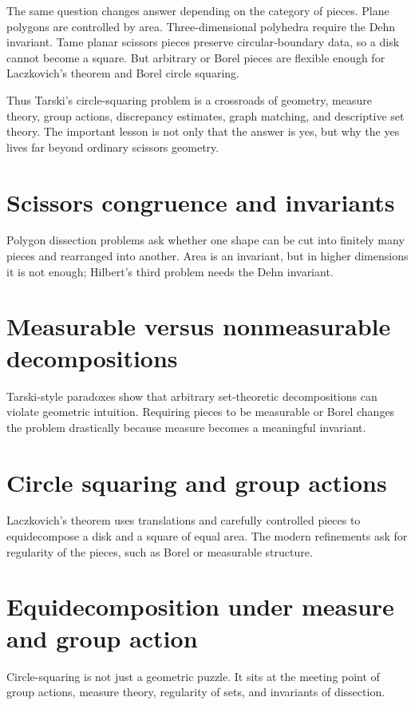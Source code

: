The same question changes answer depending on the category of pieces.  Plane polygons are controlled by area.  Three-dimensional polyhedra require the Dehn invariant.  Tame planar scissors pieces preserve circular-boundary data, so a disk cannot become a square.  But arbitrary or Borel pieces are flexible enough for Laczkovich's theorem and Borel circle squaring.

Thus Tarski's circle-squaring problem is a crossroads of geometry, measure theory, group actions, discrepancy estimates, graph matching, and descriptive set theory.  The important lesson is not only that the answer is yes, but why the yes lives far beyond ordinary scissors geometry.

\section{Scissors congruence and invariants}
Polygon dissection problems ask whether one shape can be cut into finitely many pieces and rearranged into another.  Area is an invariant, but in higher dimensions it is not enough; Hilbert's third problem needs the Dehn invariant.
\section{Measurable versus nonmeasurable decompositions}
Tarski-style paradoxes show that arbitrary set-theoretic decompositions can violate geometric intuition.  Requiring pieces to be measurable or Borel changes the problem drastically because measure becomes a meaningful invariant.
\section{Circle squaring and group actions}
Laczkovich's theorem uses translations and carefully controlled pieces to equidecompose a disk and a square of equal area.  The modern refinements ask for regularity of the pieces, such as Borel or measurable structure.
\section{Equidecomposition under measure and group action}
Circle-squaring is not just a geometric puzzle.  It sits at the meeting point of group actions, measure theory, regularity of sets, and invariants of dissection.
